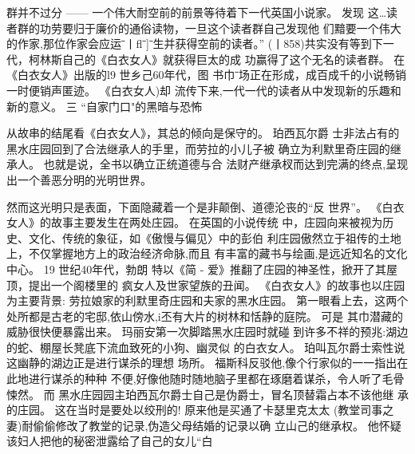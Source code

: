 \documentclass[portrait,a4paper]{article}
\begin{document}
群并不过分 ------ 一个伟大耐空前的前景等待着下一代英国小说家。 发现
这…读者群的功劳要归于廉价的通俗读物，一旦这个读者群自己发现他
们黯要一个伟大的作家,那位作家会应运ˉ丨flˉ]ˉ生并获得空前的读者。”
(丨858)共实没有等到下一代，柯林斯自己的《白衣女人》就获得巨太的成
功赢得了这个无名的读者群。 在《白衣女人》出版的l9 世乡己60年代，图
书巾ˉ场正在形成，成百成千的小说畅销一时便销声匿迹。 《白衣女人)却
流传下来,一代一代的读者从中发现新的乐趣和新的意义。
三 “自家门口"的黑暗与恐怖

从故串的结尾看《白衣女人》，其总的倾向是保守的。 珀西瓦尔爵
士非法占有的黑水庄园回到了合法继承人的手里，而劳拉的小儿子被
确立为利默里奇庄园的继承人。 也就是说，全书以确立正统道德与合
法财产继承杈而达到完满的终点,呈现出一个善恶分明的光明世界。

然而这光明只是表面，下面隐藏着一个是非颠倒、道德沦丧的“反
世界”。 《白衣女人》的故事主要发生在两处庄园。 在英国的小说传统
中，庄园向来被视为历史、文化、传统的象征，如《傲慢与偏见〉中的彭伯
利庄园傲然立于祖传的土地上，不仅掌握地方上的政治经济命脉,而且
有丰富的藏书与绘画,是远近知名的文化中心。 19 世纪40年代，勃朗
特以《简 - 爱》推翻了庄园的神圣性，掀开了其屋顶，提出一个阁楼里的
疯女人及世家望族的丑闻。 《白衣女人》的故事也以庄园为主要背景:
劳拉娘家的利默里奇庄园和夫家的黑水庄园。 第一眼看上去，这两个
处所都是古老的宅邸,依山傍水,i丕有大片的树林和恬静的庭院。 可是
其巾潜藏的威胁很快便暴露出来。 玛丽安第一次脚踏黑水庄园时就碰
到许多不祥的预兆:湖边的蛇、棚屋长凳底下流血致死的小狗、幽灵似
的白衣女人。 珀叫瓦尔爵士索性说这幽静的湖边正是进行谋杀的理想
场所。 福斯科反驳他,像个行家似的一一指出在此地进行谋杀的种种
不便,好像他随时随地脑子里都在琢磨着谋杀，令人听了毛骨悚然。 而
黑水庄园园主珀西瓦尔爵士自己是伪爵士，冒名顶替霜占本不该他继
承的庄园。 这在当时是要处以绞刑的! 原来他是买通了卡瑟里克太太
(教堂司事之妻)耐偷偷修改了教堂的记录,伪造父母结婚的记录以确
立山己的继承权。 他怀疑该妇人把他的秘密泄露给了自己的女儿“白
\end{document}
